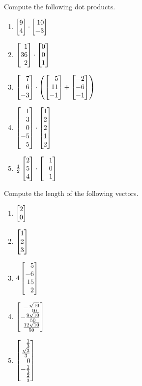 \begin{exercises}
	\begin{problist}
		\prob  Compute the following dot products.
		\begin{enumerate}
			\item   $\mat{9\\4} \cdot \mat{10\\-3}$
			\item   $\mat{1\\36\\2} \cdot \mat{0\\0\\1}$
			\item   $\mat{7\\6\\-3} \cdot \left(\mat{5\\11\\-1} + \mat{-2\\-6\\-1}\right)$
			\item   $\mat{1\\3\\0\\-5\\5} \cdot \mat{1\\2\\2\\1\\2}$
			\item   $\frac{1}{2}\mat{2\\5\\4} \cdot \mat{1\\0\\-1}$
		\end{enumerate}
		\prob Compute the length of the following vectors.
		\begin{enumerate}
			\item $\mat{2\\0}$
			\item $\mat{1\\2\\3}$
			\item $4\mat{5\\-6\\15\\2}$
			\item $\mat{-\frac{\sqrt{10}}{10}\\-\frac{9\sqrt{10}}{50}\\\frac{12\sqrt{10}}{50}}$
			\item $\mat{\frac{1}{3}\\\frac{\sqrt{3}}{3}\\0\\-\frac{1}{3}\\\frac{2}{3}}$

\end{enumerate}
\end{problist}
\end{exercises}
